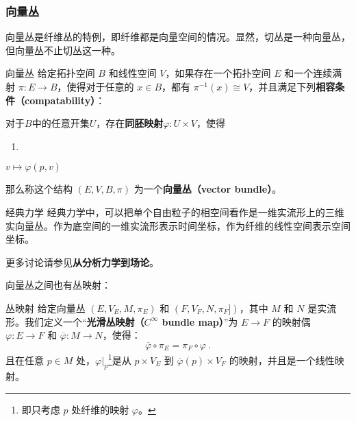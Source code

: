\subsubsection{向量丛}



向量丛是纤维丛的特例，即纤维都是向量空间的情况。显然，切丛是一种向量丛，但向量丛不止切丛这一种。

\begin{definition}{向量丛}\label{def_Fibre_1}
给定拓扑空间 $B$ 和线性空间 $V$，如果存在一个拓扑空间 $E$ 和一个连续满射 $\pi:E\rightarrow B$，使得对于任意的 $x\in B$，都有 $\pi^{-1}(x)\cong V$，并且满足下列\textbf{相容条件（compatability）}：

对于$B$中的任意开集$U$，存在\textbf{同胚映射}$\varphi: U\times V$，使得
\begin{enumerate}
\item 
\end{enumerate}

$v\mapsto \varphi(p, v)$




那么称这个结构 $(E, V, B, \pi)$ 为一个\textbf{向量丛（vector bundle）}。
\end{definition}


\begin{example}{经典力学}
经典力学中，可以把单个自由粒子的相空间看作是一维实流形上的三维实向量丛。作为底空间的一维实流形表示时间坐标，作为纤维的线性空间表示空间坐标。

更多讨论请参见\textbf{从分析力学到场论}。
\end{example}





向量丛之间也有丛映射：

\begin{definition}{丛映射}
给定向量丛 $(E, V_E, M, \pi_E)$ 和 $(F, V_F, N, \pi_F])$，其中 $M$ 和 $N$ 是实流形。我们定义一个“\textbf{光滑丛映射（$C^\infty$ bundle map）}”为 $E\rightarrow F$ 的映射偶 $\varphi: E\rightarrow F$ 和 $\overline{\varphi}: M\rightarrow N$，使得：
\begin{equation}
\overline{\varphi}\circ\pi_E=\pi_F\circ\varphi~.
\end{equation}
且在任意 $p\in M$ 处，$\varphi|_p$\footnote{即只考虑 $p$ 处纤维的映射 $\varphi$。}是从 $p\times V_E$ 到 $\overline{\varphi}(p)\times V_F$ 的映射，并且是一个线性映射。
\end{definition}





